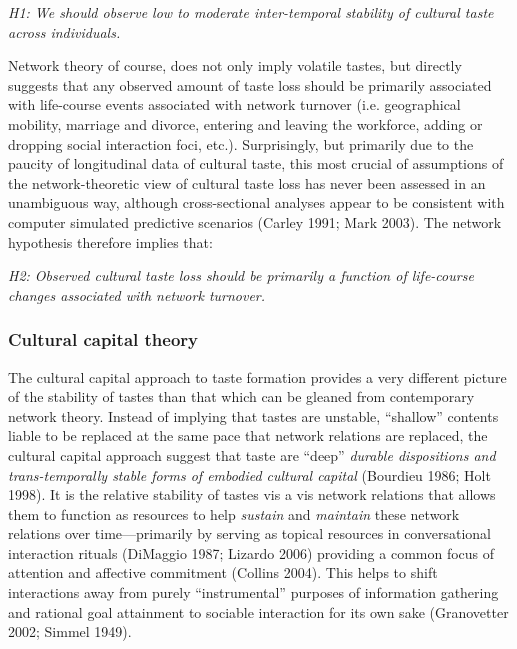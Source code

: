 \emph{H1: We should observe low to moderate inter-temporal stability of cultural taste across individuals.}

Network theory of course, does not only imply volatile tastes, but directly suggests that any observed amount of taste loss should be primarily associated with life-course events associated with network turnover (i.e. geographical mobility, marriage and divorce, entering and leaving the workforce, adding or dropping social interaction foci, etc.). Surprisingly, but primarily due to the paucity of longitudinal data of cultural taste, this most crucial of assumptions of the network-theoretic view of cultural taste loss has never been assessed in an unambiguous way, although cross-sectional analyses appear to be consistent with computer simulated predictive scenarios (Carley 1991; Mark 2003). The network hypothesis therefore implies that:

\emph{H2: Observed cultural taste loss should be primarily a function of life-course changes associated with network turnover.}

\subsubsection{Cultural capital theory}\label{cultural-capital-theory}

The cultural capital approach to taste formation provides a very different picture of the stability of tastes than that which can be gleaned from contemporary network theory. Instead of implying that tastes are unstable, ``shallow'' contents liable to be replaced at the same pace that network relations are replaced, the cultural capital approach suggest that taste are ``deep'' \emph{durable dispositions and trans-temporally stable forms of embodied cultural capital} (Bourdieu 1986; Holt 1998). It is the relative stability of tastes vis a vis network relations that allows them to function as resources to help \emph{sustain} and \emph{maintain} these network relations over time---primarily by serving as topical resources in conversational interaction rituals (DiMaggio 1987; Lizardo 2006) providing a common focus of attention and affective commitment (Collins 2004). This helps to shift interactions away from purely ``instrumental'' purposes of information gathering and rational goal attainment to sociable interaction for its own sake (Granovetter 2002; Simmel 1949).

